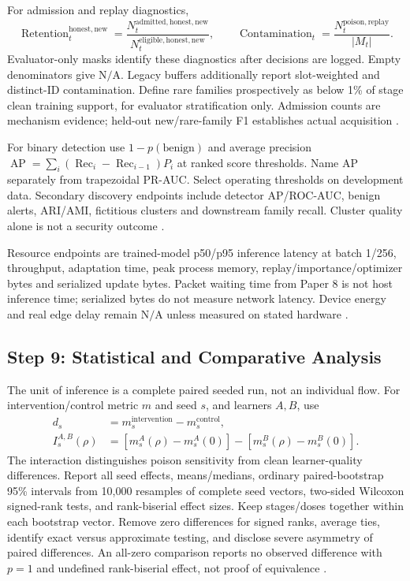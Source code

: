 \documentclass[10pt,a4paper]{article}
\newcommand{\NA}{\mathrm{N/A}}
\begin{document}
For admission and replay diagnostics,
\begin{equation}
\operatorname{Retention}^{\mathrm{honest,new}}_t=
\frac{N_t^{\mathrm{admitted,honest,new}}}{N_t^{\mathrm{eligible,honest,new}}},\qquad
\operatorname{Contamination}_t=\frac{N_t^{\mathrm{poison,replay}}}{|M_t|}.
\end{equation}
Evaluator-only masks identify these diagnostics after decisions are logged. Empty denominators give $\NA$. Legacy buffers additionally report slot-weighted and distinct-ID contamination. Define rare families prospectively as below 1\% of stage clean training support, for evaluator stratification only. Admission counts are mechanism evidence; held-out new/rare-family F1 establishes actual acquisition \cite{guo,repo}.

For binary detection use $1-p(\mathrm{benign})$ and average precision $\operatorname{AP}=\sum_i(\operatorname{Rec}_i-\operatorname{Rec}_{i-1})P_i$ at ranked score thresholds. Name AP separately from trapezoidal PR-AUC. Select operating thresholds on development data. Secondary discovery endpoints include detector AP/ROC-AUC, benign alerts, ARI/AMI, fictitious clusters and downstream family recall. Cluster quality alone is not a security outcome \cite{cnd,repo}.

Resource endpoints are trained-model p50/p95 inference latency at batch 1/256, throughput, adaptation time, peak process memory, replay/importance/optimizer bytes and serialized update bytes. Packet waiting time from Paper 8 is not host inference time; serialized bytes do not measure network latency. Device energy and real edge delay remain $\NA$ unless measured on stated hardware \cite{cerasuolo,repo}.

\subsection{Step 9: Statistical and Comparative Analysis}
The unit of inference is a complete paired seeded run, not an individual flow. For intervention/control metric $m$ and seed $s$, and learners $A,B$, use
\begin{equation}
\begin{aligned}
d_s&=m_s^{\mathrm{intervention}}-m_s^{\mathrm{control}},\\
I_s^{A,B}(\rho)&=\left[m_s^A(\rho)-m_s^A(0)\right]-\left[m_s^B(\rho)-m_s^B(0)\right].
\end{aligned}
\end{equation}
The interaction distinguishes poison sensitivity from clean learner-quality differences. Report all seed effects, means/medians, ordinary paired-bootstrap 95\% intervals from 10,000 resamples of complete seed vectors, two-sided Wilcoxon signed-rank tests, and rank-biserial effect sizes. Keep stages/doses together within each bootstrap vector. Remove zero differences for signed ranks, average ties, identify exact versus approximate testing, and disclose severe asymmetry of paired differences. An all-zero comparison reports no observed difference with $p=1$ and undefined rank-biserial effect, not proof of equivalence \cite{repo}.
\end{document}
